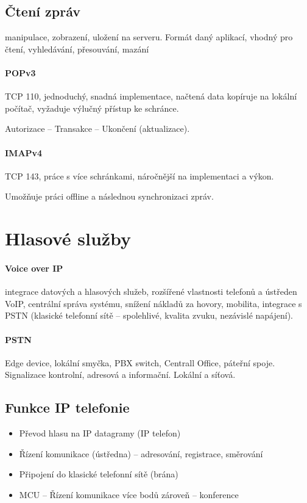 \documentclass[a4wide]{report}
\begin{document}
\subsection{Čtení zpráv}

manipulace, zobrazení, uložení na serveru. Formát daný aplikací, vhodný pro čtení, vyhledávání, přesouvání, mazání

\paragraph{POPv3}
TCP 110, jednoduchý, snadná implementace, načtená data kopíruje na lokální počítač, vyžaduje výlučný přístup ke schránce.

Autorizace -- Transakce -- Ukončení (aktualizace).

\paragraph{IMAPv4}
TCP 143, práce s více schránkami, náročnější na implementaci a výkon.

Umožňuje práci offline a následnou synchronizaci zpráv.


\section{Hlasové služby}

\paragraph{Voice over IP} integrace datových a hlasových služeb, rozšířené vlastnosti telefonů a ústředen VoIP, centrální správa systému, snížení nákladů za hovory, mobilita, integrace s PSTN (klasické telefonní sítě -- spolehlivé, kvalita zvuku, nezávislé napájení).

\paragraph{PSTN} Edge device, lokální smyčka, PBX switch, Centrall Office, páteřní spoje. Signalizace kontrolní, adresová a informační. Lokální a síťová.

\subsection{Funkce IP telefonie}
\begin{itemize}
	\item Převod hlasu na IP datagramy (IP telefon)
	\item Řízení komunikace (ústředna) -- adresování, registrace, směrování
	\item Připojení do klasické telefonní sítě (brána)
	\item MCU -- Řízení komunikace více bodů zároveň -- konference
\end{itemize}
\end{document}
